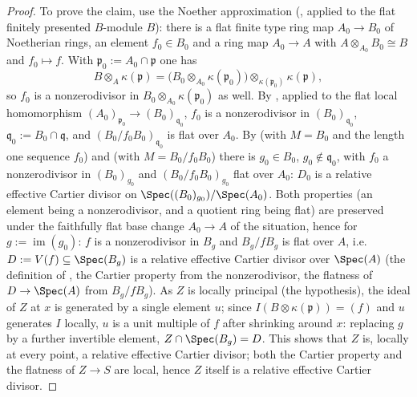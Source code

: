 \begin{proof}
To prove the claim, use the Noether approximation
(, applied to the flat finitely
presented $B$-module $B$): there is a
flat finite type ring map $A_0\to B_0$ of Noetherian rings, an element
$f_0\in B_0$ and a ring map $A_0\to A$ with
$A\otimes_{A_0}B_0\cong B$ and $f_0\mapsto f$.  With
$\mathfrak p_0:=A_0\cap\mathfrak p$ one has
\[
B\otimes_A\kappa(\mathfrak p)
=\bigl(B_0\otimes_{A_0}\kappa(\mathfrak p_0)\bigr)
\otimes_{\kappa(\mathfrak p_0)}\kappa(\mathfrak p),
\]
so $f_0$ is a nonzerodivisor in
$B_0\otimes_{A_0}\kappa(\mathfrak p_0)$ as well.  By
, applied to the flat local
homomorphism $(A_0)_{\mathfrak p_0}\to(B_0)_{\mathfrak q_0}$, $f_0$ is a
nonzerodivisor in $(B_0)_{\mathfrak q_0}$, $\mathfrak
q_0:=B_0\cap\mathfrak q$, and $(B_0/f_0B_0)_{\mathfrak q_0}$ is flat
over $A_0$.  By  (with
$M=B_0$ and the length one sequence $f_0$) and
 (with $M=B_0/f_0B_0$) there is
$g_0\in B_0$, $g_0\notin\mathfrak q_0$, with $f_0$ a nonzerodivisor
in $(B_0)_{g_0}$ and $(B_0/f_0B_0)_{g_0}$ flat over $A_0$: $D_0$ is a
relative effective Cartier divisor on
$\Spec((B_0)_{g_0})/\Spec(A_0)$.  Both properties (an element being a
nonzerodivisor, and a quotient ring being flat) are preserved under
the faithfully flat base change $A_0\to A$ of the situation, hence
for $g:=\operatorname{im}(g_0)$: $f$ is a nonzerodivisor in $B_g$ and
$B_g/fB_g$ is flat over $A$, i.e.\ $D:=V(f)\subseteq\Spec(B_g)$ is a
relative effective Cartier divisor over $\Spec(A)$ (the definition of
, the Cartier property from
the nonzerodivisor, the flatness of $D\to\Spec(A)$ from
$B_g/fB_g$).  As $Z$ is locally principal (the hypothesis), the ideal
of $Z$ at $x$ is generated by a single element $u$; since
$I(B\otimes\kappa(\mathfrak p))=(f)$ and $u$ generates $I$ locally,
$u$ is a unit multiple of $f$ after shrinking around $x$: replacing
$g$ by a further invertible element, $Z\cap\Spec(B_g)=D$.
This shows that $Z$ is, locally at every point, a relative effective
Cartier divisor; both the Cartier property and the flatness of
$Z\to S$ are local, hence $Z$ itself is a relative effective Cartier
divisor.
\end{proof}




